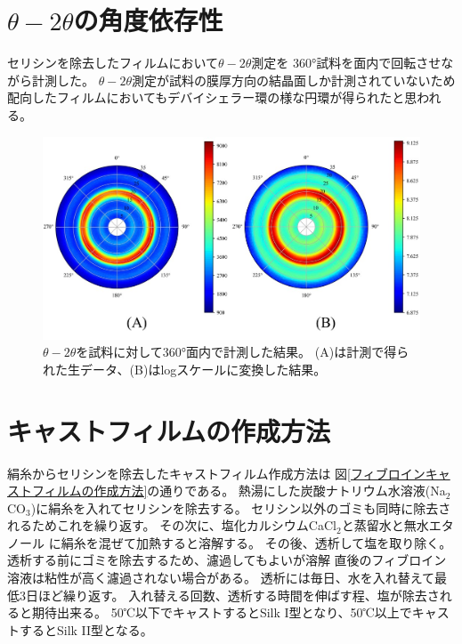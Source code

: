 \documentclass[dvipdfmx,12pt,a4paper]{jreport}
\begin{document}
	\section{$\theta-2\theta$の角度依存性}
	セリシンを除去したフィルムにおいて$\theta-2\theta$測定を
	360°試料を面内で回転させながら計測した。
	$\theta-2\theta$測定が試料の膜厚方向の結晶面しか計測されていないため
	配向したフィルムにおいてもデバイシェラー環の様な円環が得られたと思われる。
	\begin{figure}[h]
		\centering
		\includegraphics{デバイ.jpg}
		\caption{$\theta-2\theta$を試料に対して360°面内で計測した結果。
		(A)は計測で得られた生データ、(B)はlogスケールに変換した結果。}
	\end{figure}
	\newpage
	\section{キャストフィルムの作成方法}
	絹糸からセリシンを除去したキャストフィルム作成方法は
	図\ref{フィブロインキャストフィルムの作成方法}の通りである。
	熱湯にした炭酸ナトリウム水溶液(Na$_2$CO$_3$)に絹糸を入れてセリシンを除去する。
	セリシン以外のゴミも同時に除去されるためこれを繰り返す。
	その次に、塩化カルシウムCaCl$_2$と蒸留水と無水エタノール
	に絹糸を混ぜて加熱すると溶解する。
	その後、透析して塩を取り除く。
	透析する前にゴミを除去するため、濾過してもよいが溶解
	直後のフィブロイン溶液は粘性が高く濾過されない場合がある。
	透析には毎日、水を入れ替えて最低3日ほど繰り返す。
	入れ替える回数、透析する時間を伸ばす程、塩が除去されると期待出来る。
	50℃以下でキャストするとSilk I型となり、50℃以上でキャストするとSilk II型となる。
\end{document}
